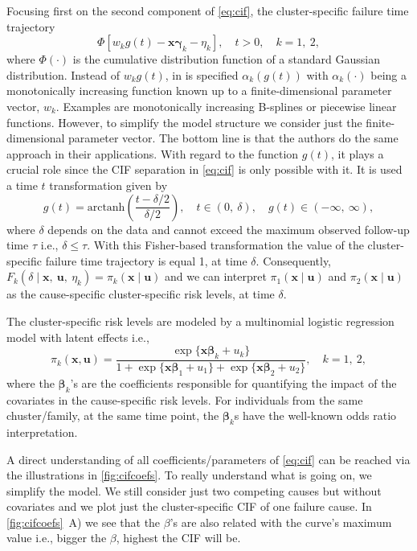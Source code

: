 Focusing first on the second component of \autoref{eq:cif}, the
cluster-specific failure time trajectory
\[
 \Phi[w_{k} g(t) - \bm{x}\bm{\gamma}_{k} - \eta_{k}],
 \quad t > 0, \quad k = 1,~2,
\]
where \(\Phi(\cdot)\) is the cumulative distribution function of a
standard Gaussian distribution. Instead of \(w_{k} g(t)\), in
 is specified \(\alpha_{k}(g(t))\) with
\(\alpha_{k}(\cdot)\) being a monotonically increasing function known up
to a finite-dimensional parameter vector, \(w_{k}\). Examples are
monotonically increasing B-splines or piecewise linear functions.
However, to simplify the model structure we consider just the
finite-dimensional parameter vector. The bottom line is that the authors
do the same approach in their applications. With regard to the function
\(g(t)\), it plays a crucial role since the CIF separation in
\autoref{eq:cif} is only possible with it. It is used a time \(t\)
transformation given by
\[
 g(t) = \text{arctanh}\left(\frac{t - \delta/2}{\delta/2}\right),
 \quad t\in(0,~\delta), \quad g(t)\in(-\infty,~\infty),
\]
where \(\delta\) depends on the data and cannot exceed the maximum
observed follow-up time \(\tau\) i.e., \(\delta \leq \tau\). With this
Fisher-based transformation the value of the cluster-specific failure
time trajectory is equal 1, at time \(\delta\). Consequently, \(F_{k}
(\delta \mid \bm{x},~\bm{u},~\eta_{k}) = \pi_{k}(\bm{x} \mid
\bm{u})\) and we can interpret \(\pi_{1}(\bm{x} \mid \bm{u})\) and
\(\pi_{2}(\bm{x} \mid \bm{u})\) as the cause-specific
cluster-specific risk levels, at time \(\delta\).

The cluster-specific risk levels are modeled by a multinomial logistic
regression model with latent effects i.e.,
\begin{equation}
 \pi_{k}(\bm{x}, \bm{u}) =
 \frac{\exp\{\bm{x}\bm{\beta}_{k} + u_{k}\}}{1 +
  \exp\{\bm{x}\bm{\beta}_{1} + u_{1}\} +
  \exp\{\bm{x}\bm{\beta}_{2} + u_{2}\}}, \quad k = 1,~2,
 \label{eq:risklevel}
\end{equation}
where the \(\bm{\beta}_{k}\)'s are the coefficients responsible for
quantifying the impact of the covariates in the cause-specific risk
levels. For individuals from the same chuster/family, at the same time
point, the \(\bm{\beta}_{k}\)s have the well-known odds ratio
interpretation.

A direct understanding of all coefficients/parameters of
\autoref{eq:cif} can be reached via the illustrations in
\autoref{fig:cifcoefs}. To really understand what is going on, we
simplify the model. We still consider just two competing causes but
without covariates and we plot just the cluster-specific CIF of one
failure cause. In \autoref{fig:cifcoefs}~A) we see that the \(\beta\)'s
are also related with the curve's maximum value i.e., bigger the
\(\beta\), highest the CIF will be.


